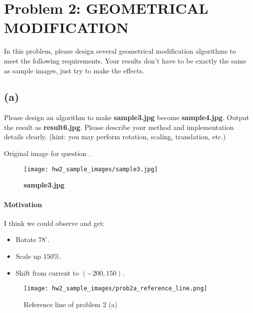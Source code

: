 \newpage
\section{Problem 2: GEOMETRICAL MODIFICATION}\label{problem-2-geo-modify}
In this problem, please design several geometrical modification algorithms to meet the following requirements. Your results don’t have to be exactly the same as sample images, just try to make the effects.

\subsection{(a)}\label{2_a}
Please design an algorithm to make \textbf{sample3.jpg} become \textbf{sample4.jpg}. Output the result as \textbf{result6.jpg}. Please describe your method and implementation details clearly. (hint: you may perform rotation, scaling, translation, etc.)

Original image  for question .
\begin{figure}
    \centering
    \texttt{[image: hw2\_sample\_images/sample3.jpg]}
    \caption{\textbf{sample3.jpg}}
    \label{sample3}
\end{figure}

\paragraph{Motivation}
I think we could observe  and get:
\begin{itemize}
    \item Rotate $78^{\circ}$.
    \item Scale up $150$\%.
    \item Shift from current to $(-200, 150)$.
\end{itemize}
 
\begin{figure}
    \centering
    \texttt{[image: hw2\_sample\_images/prob2a\_reference\_line.png]}
    \caption{Reference line of problem 2 (a)}
    \label{prob2a_reference_line}
\end{figure}

